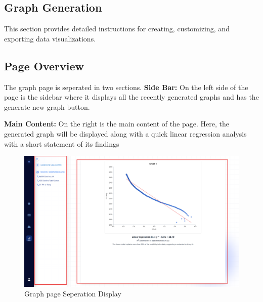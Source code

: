 \documentclass[12pt]{article}
\begin{document}

\subsection{Graph Generation}

This section provides detailed instructions for creating, customizing, and
exporting data visualizations.

\subsection*{Page Overview}
The graph page is seperated in two sections. 
\newline \newline
\textbf{Side Bar:} \newline
On the left side of the page is the sidebar where it displays all the recently
generated graphs and has the generate new graph button.
\newline\newline

\noindent \textbf{Main Content:}\newline
On the right is the main content of the page. Here, the generated graph will be
displayed along with a quick linear regression analysis with a short statement
of its findings 
\begin{figure}[H]
    \centering
    \includegraphics[scale=0.3]{Images/graph page .png}
    \caption{Graph page Seperation Display}
    \label{fig:example}
\end{figure}
\end{document}
